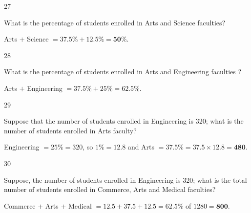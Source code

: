 \begin{question}{27}
{What is the percentage of students enrolled in Arts and Science faculties?\par}
\begin{explain}
Arts $+$ Science $=37.5\%+12.5\%=\mathbf{50\%}$.
\end{explain}
\end{question}

\begin{question}{28}
{What is the percentage of students enrolled in Arts and Engineering faculties ?\par}
\begin{explain}
Arts $+$ Engineering $=37.5\%+25\%=\mathbf{62.5\%}$.
\end{explain}
\end{question}

\begin{question}{29}
{Suppose that the number of students enrolled in Engineering is 320; what is the number of students enrolled in Arts faculty?\par}
\begin{explain}
Engineering $=25\%=320$, so $1\%=12.8$ and Arts $=37.5\%=37.5\times12.8=\mathbf{480}$.
\end{explain}
\end{question}

\begin{question}{30}
{Suppose, the number of students enrolled in Engineering is 320; what is the total number of students enrolled in Commerce, Arts and Medical faculties?\par}
\begin{explain}
Commerce $+$ Arts $+$ Medical $=12.5+37.5+12.5=62.5\%$ of $1280=\mathbf{800}$.
\end{explain}
\end{question}

